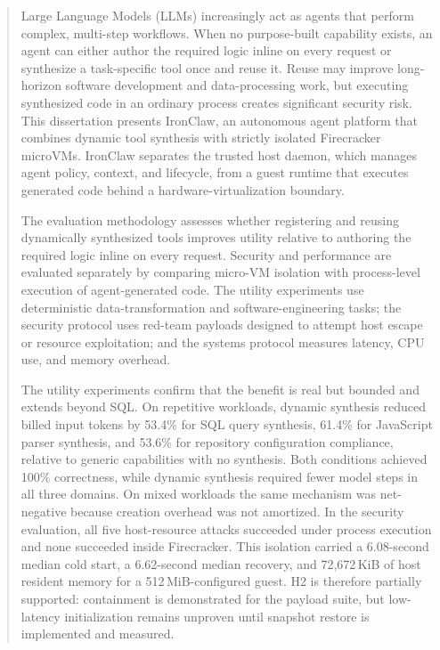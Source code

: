 \documentclass[11pt, a4paper, oneside]{Thesis} %
\begin{document}
\begin{abstract}
Large Language Models (LLMs) increasingly act as agents that perform complex,
multi-step workflows. When no purpose-built capability exists, an agent can
either author the required logic inline on every request or synthesize a
task-specific tool once and reuse it. Reuse may improve long-horizon software
development and data-processing work, but executing synthesized code in an
ordinary process creates significant security risk. This dissertation presents
IronClaw, an autonomous agent platform that combines dynamic tool synthesis with
strictly isolated Firecracker microVMs. IronClaw separates the trusted host
daemon, which manages agent policy, context, and lifecycle, from a guest runtime
that executes generated code behind a hardware-virtualization boundary.

The evaluation methodology assesses whether registering and reusing dynamically synthesized tools improves utility relative to authoring the required logic inline on every request. Security and performance are evaluated separately by comparing micro-VM isolation with process-level execution of agent-generated code. The utility experiments use deterministic data-transformation and software-engineering tasks; the security protocol uses red-team payloads designed to attempt host escape or resource exploitation; and the systems protocol measures latency, CPU use, and memory overhead.

The utility experiments confirm that the benefit is real but bounded and extends beyond SQL. On repetitive workloads, dynamic synthesis reduced billed input tokens by 53.4\% for SQL query synthesis, 61.4\% for JavaScript parser synthesis, and 53.6\% for repository configuration compliance, relative to generic capabilities with no synthesis. Both conditions achieved 100\% correctness, while dynamic synthesis required fewer model steps in all three domains. On mixed workloads the same mechanism was net-negative because creation overhead was not amortized. In the security evaluation, all five host-resource attacks succeeded under process execution and none succeeded inside Firecracker. This isolation carried a 6.08-second median cold start, a 6.62-second median recovery, and 72{,}672\,KiB of host resident memory for a 512\,MiB-configured guest. H2 is therefore partially supported: containment is demonstrated for the payload suite, but low-latency initialization remains unproven until snapshot restore is implemented and measured.
\end{abstract}
\end{document}
